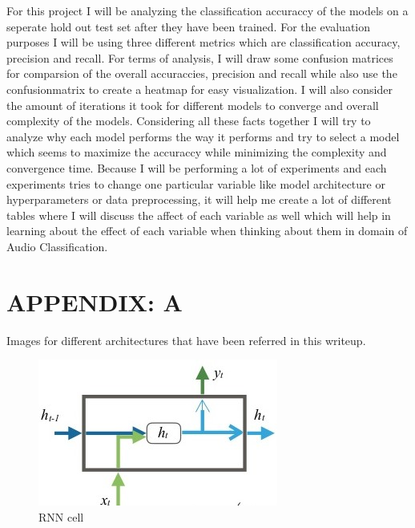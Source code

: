 \documentclass[letterpaper, 12 pt, conference]{ieeeconf}  %
\begin{document}
For this project I will be analyzing the classification accuraccy of the models on a seperate hold out test set after they have been trained. For the evaluation purposes I will be using three different metrics which are classification accuracy, precision and recall. For terms of analysis, I will draw some confusion matrices for comparsion of the overall accuraccies, precision and recall while also use the confusionmatrix to create a heatmap for easy visualization. I will also consider the amount of iterations it took for different models to converge and overall complexity of the models. Considering all these facts together I will try to analyze why each model performs the way it performs and try to select a model which seems to maximize the accuraccy while minimizing the complexity and convergence time. Because I will be performing a lot of experiments and each experiments tries to change one particular variable like model architecture or hyperparameters or data preprocessing, it will help me create a lot of different tables where I will discuss the affect of each variable as well which will help in learning about the effect of each variable when thinking about them in domain of Audio Classification. 

\section{APPENDIX: A}

Images for different architectures that have been referred in this writeup.

\begin{figure}[!h]
\centering
\includegraphics[scale=0.8]{../figs/rnn.jpg}	
\caption{RNN cell}
\label{fig:RNN} 
\end{figure}
\end{document}
